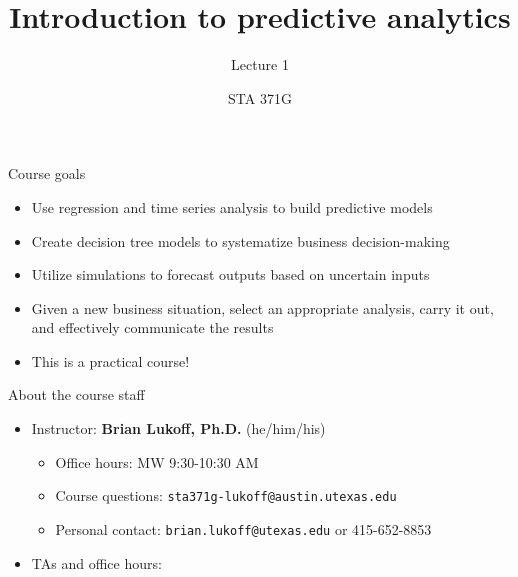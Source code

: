 \documentclass{beamer}\usepackage[]{graphicx}\usepackage[]{color}
\title{Introduction to predictive analytics}
\subtitle{Lecture 1}
\author{STA 371G}
\begin{document}
  \frame{\maketitle}



  \begin{darkframes}
    \begin{frame}{Course goals}
      \begin{itemize}
        \item Use regression and time series analysis to build predictive models
        \item Create decision tree models to systematize business decision-making
        \item Utilize simulations to forecast outputs based on uncertain inputs
        \item Given a new business situation, select an appropriate analysis, carry it out, and effectively communicate the results
        \item \alert{This is a practical course!}
      \end{itemize}
    \end{frame}

    \begin{frame}{About the course staff}
      \begin{itemize}
        \item Instructor: \textbf{Brian Lukoff, Ph.D.} (he/him/his)
          \begin{itemize}
            \item Office hours: MW 9:30-10:30 AM
            \item Course questions: \texttt{sta371g-lukoff@austin.utexas.edu}
            \item Personal contact: \texttt{brian.lukoff@utexas.edu} or 415-652-8853
          \end{itemize}
        \item TAs and office hours:
      \end{itemize}


\end{frame}
\end{darkframes}
\end{document}
